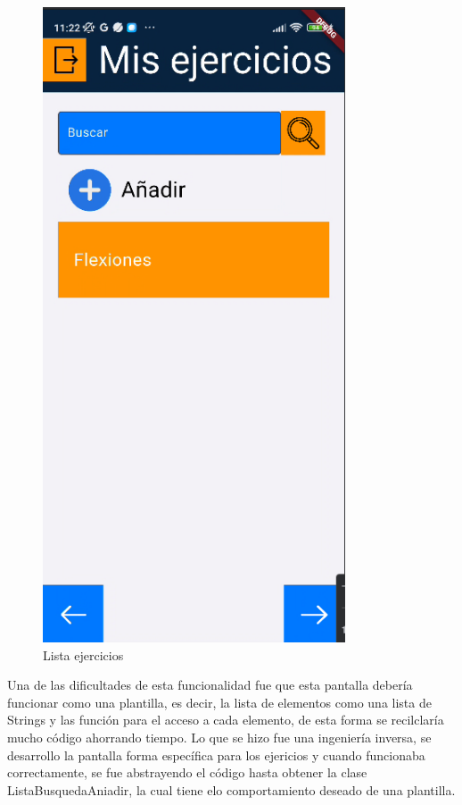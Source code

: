 \begin{figure}[H]
   \centering
    \includegraphics[width=0.8\textwidth]{pantallas/listaEjercicios.png}
    \caption{Lista ejercicios}
    \label{fig:ListaEjer}
\end{figure}

Una de las dificultades de esta funcionalidad fue que esta pantalla debería funcionar como una plantilla, es decir, la lista de elementos como una lista de Strings y las función para el acceso a cada elemento, de esta forma se recilclaría mucho código ahorrando tiempo. Lo que se hizo fue una ingeniería inversa, se desarrollo la pantalla forma específica para los ejericios y cuando funcionaba correctamente, se fue abstrayendo el código hasta obtener la clase ListaBusquedaAniadir, la cual tiene elo comportamiento deseado de una plantilla.

